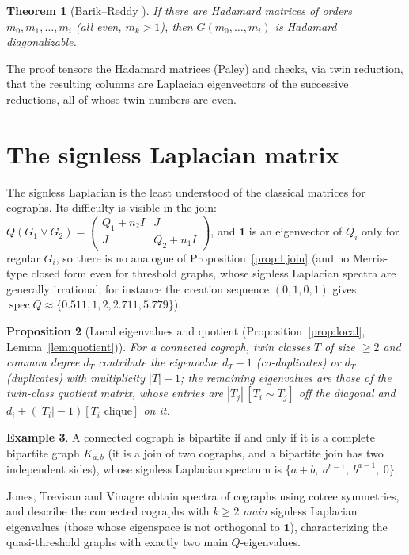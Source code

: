 \documentclass[11pt]{article}
\theoremstyle{plain}
\newtheorem{theorem}{Theorem}[section]
\newtheorem{proposition}[theorem]{Proposition}
\theoremstyle{definition}
\newtheorem{example}[theorem]{Example}
\theoremstyle{remark}
\DeclareMathOperator{\spec}{spec}
\begin{document}
	\begin{theorem}[Barik--Reddy \cite{BarikReddy2023}]
		\label{thm:BRhadamard}
		If there are Hadamard matrices of orders $m_0,m_1,\dots,m_i$ (all even, $m_k>1$), then $G(m_0,\dots,m_i)$ is Hadamard diagonalizable.
	\end{theorem}
	
	The proof tensors the Hadamard matrices (Paley) and checks, via twin reduction, that the resulting columns are Laplacian eigenvectors of the successive reductions, all of whose twin numbers are even.
	
	\section{The signless Laplacian matrix}
	\label{sec:signless}
	
	The signless Laplacian is the least understood of the classical matrices for cographs. Its difficulty is visible in the join: $Q(G_1\vee G_2)=\begin{pmatrix}Q_1+n_2I&J\\J&Q_2+n_1I\end{pmatrix}$, and $\mathbf1$ is an eigenvector of $Q_i$ only for regular $G_i$, so there is no analogue of Proposition~\ref{prop:Ljoin} (and no Merris-type closed form even for threshold graphs, whose signless Laplacian spectra are generally irrational; for instance the creation sequence $(0,1,0,1)$ gives $\spec Q\approx\{0.511,1,2,2.711,5.779\}$).
	
	\begin{proposition}[Local eigenvalues and quotient (Proposition~\ref{prop:local}, Lemma~\ref{lem:quotient})]
		\label{prop:Qlocal}
		For a connected cograph, twin classes $T$ of size $\ge2$ and common degree $d_T$ contribute the eigenvalue $d_T-1$ (co-duplicates) or $d_T$ (duplicates) with multiplicity $|T|-1$; the remaining eigenvalues are those of the twin-class quotient matrix, whose entries are $|T_j|\,[T_i\sim T_j]$ off the diagonal and $d_i+(|T_i|-1)[T_i\text{ clique}]$ on it.
	\end{proposition}
	
	\begin{example}
		A connected cograph is bipartite if and only if it is a complete bipartite graph $K_{a,b}$ (it is a join of two cographs, and a bipartite join has two independent sides), whose signless Laplacian spectrum is $\{a+b,\ a^{b-1},\ b^{a-1},\ 0\}$.
	\end{example}
	
	Jones, Trevisan and Vinagre \cite{JonesTrevisanVinagre2023} obtain spectra of cographs using cotree symmetries, and \cite{JonesTrevisanVinagre2024} describe the connected cographs with $k\ge2$ \emph{main} signless Laplacian eigenvalues (those whose eigenspace is not orthogonal to $\mathbf1$), characterizing the quasi-threshold graphs with exactly two main $Q$-eigenvalues. 
	
\end{document}
